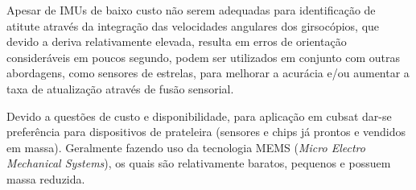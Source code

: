 Apesar de IMUs de baixo custo não serem adequadas para identificação de atitute através da integração das velocidades angulares dos girsocópios, 
que devido a deriva relativamente elevada, resulta em erros de orientação consideráveis em poucos segundo, 
podem ser utilizados em conjunto com outras abordagens, como sensores de estrelas, para melhorar a acurácia e/ou aumentar a taxa de atualização através de fusão sensorial.

Devido a questões de custo e disponibilidade, para aplicação em cubsat dar-se preferência para dispositivos de prateleira (sensores e chips já prontos e vendidos em massa). 
Geralmente fazendo uso da tecnologia MEMS (\textit{Micro Electro Mechanical Systems}), os quais são relativamente baratos, pequenos e possuem massa reduzida. 
